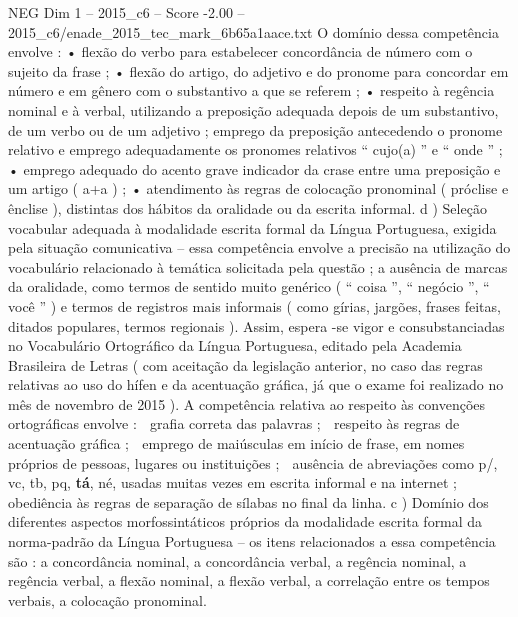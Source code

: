 \begin{textsample}{NEG Dim 1 – 2015\_c6 – Score -2.00 – 2015\_c6/enade\_2015\_tec\_mark\_6b65a1aace.txt}
O domínio dessa competência envolve : • flexão do verbo para estabelecer concordância de número com o sujeito da frase ; • flexão do artigo, do adjetivo e do pronome para concordar em número e em gênero com o substantivo a que se referem ; • respeito à regência nominal e à verbal, utilizando a preposição adequada depois de um substantivo, de um verbo ou de um adjetivo ; emprego da preposição antecedendo o pronome relativo e emprego adequadamente os pronomes relativos “ cujo(a) ” e “ onde ” ; • emprego adequado do acento grave indicador da crase entre uma preposição e um artigo ( a+a ) ; • atendimento às regras de colocação pronominal ( próclise e ênclise ), distintas dos hábitos da oralidade ou da escrita informal. d ) Seleção vocabular adequada à modalidade escrita formal da Língua Portuguesa, exigida pela situação comunicativa – essa competência envolve a precisão na utilização do vocabulário relacionado à temática solicitada pela questão ; a ausência de marcas da oralidade, como termos de sentido muito genérico ( “ coisa ”, “ negócio ”, “ você ” ) e termos de registros mais informais ( como gírias, jargões, frases feitas, ditados populares, termos regionais ).
Assim, espera -se vigor e consubstanciadas no Vocabulário Ortográfico da Língua Portuguesa, editado pela Academia Brasileira de Letras ( com aceitação da legislação anterior, no caso das regras relativas ao uso do hífen e da acentuação gráfica, já que o exame foi realizado no mês de novembro de 2015 ).
A competência relativa ao respeito às convenções ortográficas envolve :  grafia correta das palavras ;  respeito às regras de acentuação gráfica ;  emprego de maiúsculas em início de frase, em nomes próprios de pessoas, lugares ou instituições ;  ausência de abreviações como p/, vc, tb, pq, \textbf{tá}, né, usadas muitas vezes em escrita informal e na internet ;  obediência às regras de separação de sílabas no final da linha. c ) Domínio dos diferentes aspectos morfossintáticos próprios da modalidade escrita formal da norma-padrão da Língua Portuguesa – os itens relacionados a essa competência são : a concordância nominal, a concordância verbal, a regência nominal, a regência verbal, a flexão nominal, a flexão verbal, a correlação entre os tempos verbais, a colocação pronominal.

\end{textsample}
